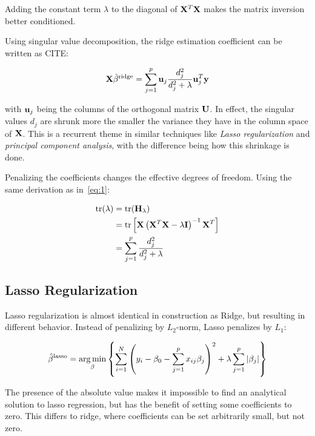 Adding the constant term \(\lambda\) to the diagonal of \(\vb{X}^{T}\vb{X}\) makes
the matrix inversion better conditioned.

Using singular value decomposition, the ridge estimation coefficient can be
written as CITE:

\begin{equation*}
  \vb{X}\hat\beta^{\text{ridge}} = \sum_{j=1}^{p} \vb{u}_{j}\frac{d_{j}^{2}}{d_{j}^{2}+ \lambda}\vb{u}_{j}^{T}\vb{y}
\end{equation*}

with \(\vb{u}_{j}\) being the columns of the orthogonal matrix \(\vb{U}\). In
effect, the singular values \(d_{j}\) are shrunk more the smaller the variance
they have in the column space of \(\vb{X}\). This is a recurrent theme in
similar techniques like \textit{Lasso regularization} and \textit{principal
  component analysis}, with the difference being how this shrinkage is done.

Penalizing the coefficients changes the effective degrees of freedom. Using the
same derivation as in~\eqref{eq:1}:

\begin{align*}
  \text{tr}(\lambda) &= \text{tr}(\vb{H}_{\lambda}) \\
  &= \text{tr}\left[ \vb{X}\left( \vb{X}^{T}\vb{X}  - \lambda \vb{I}\right)^{-1}\vb{X}^{T}\right]\\
                     &= \sum_{j=1}^{p}\frac{d_{j}^{2}}{d_{j}^{2}+\lambda}
\end{align*}

\subsection{Lasso Regularization}\label{subsec:Lasso}
Lasso regularization is almost identical in construction as Ridge, but resulting
in different behavior. Instead of penalizing by \(L_{2}\)-norm, Lasso penalizes by
\(L_{1}\):

\begin{equation*}
  \hat\beta^{\text{lasso}}  = \operatorname*{arg\,min}_{\beta}\left\{ \sum_{i=1}^{N}\left( y_{i} - \beta_{0} - \sum_{j=1}^{p}x_{ij}\beta_{j} \right)^{2} + \lambda\sum_{j=1}^{p}|\beta_{j}| \right\}
\end{equation*}

The presence of the absolute value makes it impossible to find an analytical
solution to lasso regression, but has the benefit of setting some coefficients
to zero. This differs to ridge, where coefficients can be set arbitrarily small,
but not zero. 

